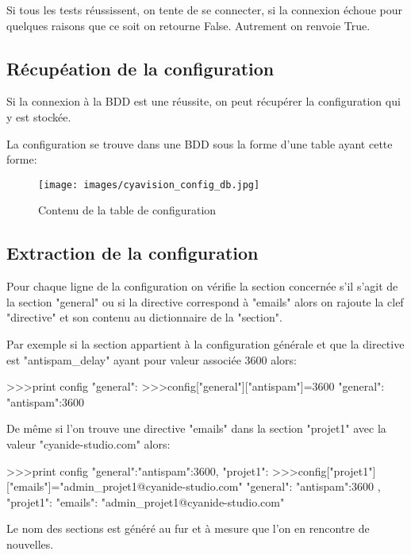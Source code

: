 Si tous les tests réussissent, on tente de se connecter, si la connexion échoue pour quelques raisons que ce soit on retourne False. Autrement on renvoie True.


\subsection*{Récupéation de la configuration}
Si la connexion à la BDD est une réussite, on peut récupérer la configuration qui y est stockée.

La configuration se trouve dans une BDD sous la forme d'une table ayant cette forme:

\begin{figure}[h!]
	\centering
	\texttt{[image: images/cyavision\_config\_db.jpg]}
	\caption{Contenu de la table de configuration}
\end{figure}

\newpage

\subsection*{Extraction de la configuration}

Pour chaque ligne de la configuration on vérifie la section concernée s'il s'agit de la section "general" ou si la directive correspond à "emails" alors on rajoute la clef "directive" et son contenu au dictionnaire de la "section". 

Par exemple si la section appartient à la configuration générale et que la directive est "antispam\_delay" ayant pour valeur associée 3600 alors:

\begin{python}
>>>print config
{"general":{}}
>>>config["general"]["antispam"]=3600
{
	"general":
	{
		"antispam":3600
	}
}
\end{python}

De même si l'on trouve une directive "emails" dans la section "projet1" avec la valeur "cyanide-studio.com" alors:

\begin{python}
>>>print config
{"general":{"antispam":3600}, "projet1":{}}
>>>config["projet1"]["emails"]="admin_projet1@cyanide-studio.com"
{
	"general":
	{
		"antispam":3600
	},
	"projet1":
	{
		"emails": "admin_projet1@cyanide-studio.com"
	}
}
\end{python}

Le nom des sections est généré au fur et à mesure que l'on en rencontre de nouvelles.

